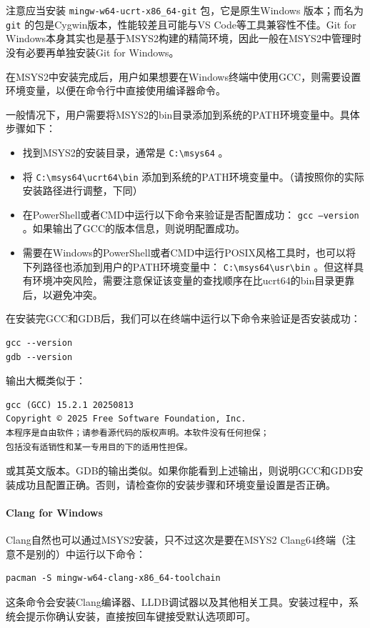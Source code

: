 注意应当安装 \verb|mingw-w64-ucrt-x86_64-git| 包，它是原生Windows 版本；而名为 \verb|git| 的包是Cygwin版本，性能较差且可能与VS Code等工具兼容性不佳。Git for Windows本身其实也是基于MSYS2构建的精简环境，因此一般在MSYS2中管理时没有必要再单独安装Git for Windows。


在MSYS2中安装完成后，用户如果想要在Windows终端中使用GCC，则需要设置环境变量，以便在命令行中直接使用编译器命令。

一般情况下，用户需要将MSYS2的bin目录添加到系统的PATH环境变量中。具体步骤如下：

\begin{itemize}
  \item 找到MSYS2的安装目录，通常是 \verb|C:\msys64| 。
  \item 将 \verb|C:\msys64\ucrt64\bin| 添加到系统的PATH环境变量中。（请按照你的实际安装路径进行调整，下同）
  \item 在PowerShell或者CMD中运行以下命令来验证是否配置成功： \texttt{gcc --version} 。如果输出了GCC的版本信息，则说明配置成功。
  \item 需要在Windows的PowerShell或者CMD中运行POSIX风格工具时，也可以将下列路径也添加到用户的PATH环境变量中： \verb|C:\msys64\usr\bin| 。但这样具有环境冲突风险，需要注意保证该变量的查找顺序在比ucrt64的bin目录更靠后，以避免冲突。
\end{itemize}

在安装完GCC和GDB后，我们可以在终端中运行以下命令来验证是否安装成功：
\begin{verbatim}
gcc --version
gdb --version
\end{verbatim}

输出大概类似于：
\begin{verbatim}
gcc (GCC) 15.2.1 20250813
Copyright © 2025 Free Software Foundation, Inc.
本程序是自由软件；请参看源代码的版权声明。本软件没有任何担保；
包括没有适销性和某一专用目的下的适用性担保。
\end{verbatim}
或其英文版本。GDB的输出类似。如果你能看到上述输出，则说明GCC和GDB安装成功且配置正确。否则，请检查你的安装步骤和环境变量设置是否正确。

\paragraph{Clang for Windows} Clang自然也可以通过MSYS2安装，只不过这次是要在MSYS2 Clang64终端（注意不是别的）中运行以下命令：
\begin{verbatim}
pacman -S mingw-w64-clang-x86_64-toolchain
\end{verbatim}
这条命令会安装Clang编译器、LLDB调试器以及其他相关工具。安装过程中，系统会提示你确认安装，直接按回车键接受默认选项即可。

